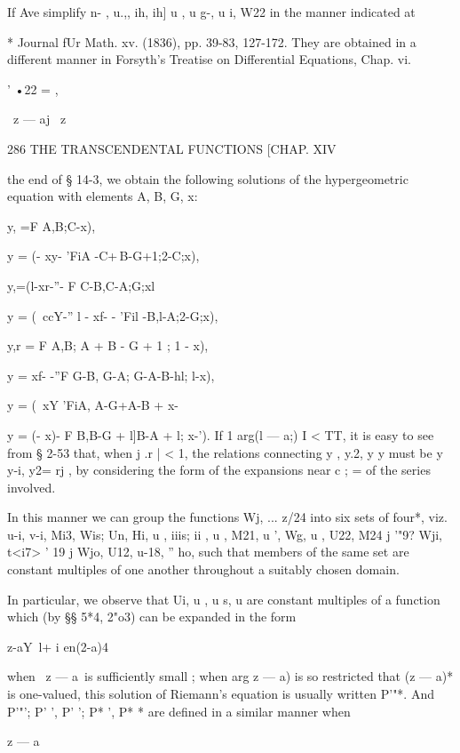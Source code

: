 If Ave simplify n- , u.,, ih, ih] u , u g-, u i, W22 in the manner
indicated at

* Journal fUr Math. xv. (1836), pp. 39-83, 127-172. They are obtained
in a different manner in Forsyth's Treatise on Differential Equations,
Chap. vi.



' •22 = ,

\ z — aj \ z



286 THE TRANSCENDENTAL FUNCTIONS [CHAP. XIV

the end of § 14-3, we obtain the following solutions of the
hypergeometric equation with elements A, B, G, x:

y, =F A,B;C-x),

y = (- xy- 'FiA -C+\,B-G+1;2-C;x),

y,=(l-xr-''- F C-B,C-A;G;xl

y = (\ ccY-'' l - xf- - 'Fil -B,l-A;2-G;x),

y,r = F A,B; A + B - G + 1 ; 1 - x),

y = xf- -''F G-B, G-A; G-A-B-hl; l-x),

y = (\ xY 'FiA, A-G+\;A-B + \; x-%

y = (- x)- F B,B-G + l]B-A + l; x-'). If 1 arg(l — a;) I < TT, it is
easy to see from § 2-53 that, when j .r | < 1, the relations
connecting y , y.2, y y must be y y-i, y2= rj , by considering the
form of the expansions near c ; = of the series involved.

In this manner we can group the functions Wj, ... z/24 into six sets
of four*, viz. u-i, v-i, Mi3, Wis; Un, Hi, u , iiis; ii , u , M21, u
', Wg, u , U22, M24 j '"9? Wji, t<i7> ' 19 j Wjo, U12, u-18, '' ho,
such that members of the same set are constant multiples of one
another throughout a suitably chosen domain.

In particular, we observe that Ui, u , u s, u are constant multiples
of a function which (by §§ 5*4, 2"o3) can be expanded in the form



 z-aY\ l+ i en(2-a)4



when \ z — a\ is sufficiently small ; when arg z — a) is so restricted
that (z — a)* is one-valued, this solution of Riemann's equation is
usually written P'"*. And P'"'; P' ', P' '; P* ', P* * are defined in
a similar manner when



z — a



